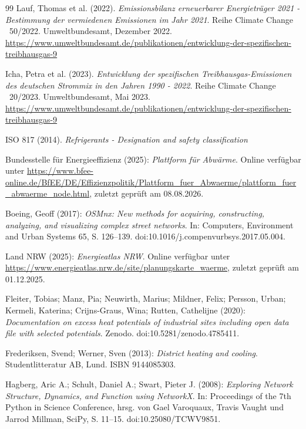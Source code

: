 \documentclass[letterpaper,11pt]{article}
\begin{document}
\begin{thebibliography}{99}
 Lauf, Thomas et al. (2022). \textit{Emissionsbilanz erneuerbarer Energieträger 2021 - Bestimmung der vermiedenen Emissionen im Jahr 2021}. Reihe Climate Change \textbar\ 50/2022. Umweltbundesamt, Dezember 2022. \\
\url{https://www.umweltbundesamt.de/publikationen/entwicklung-der-spezifischen-treibhausgas-9}

 Icha, Petra et al. (2023). \textit{Entwicklung der spezifischen Treibhausgas-Emissionen des deutschen Strommix in den Jahren 1990 - 2022}. Reihe Climate Change \textbar\ 20/2023. Umweltbundesamt, Mai 2023. \\
\url{https://www.umweltbundesamt.de/publikationen/entwicklung-der-spezifischen-treibhausgas-9}

 ISO 817 (2014). \textit{Refrigerants - Designation and safety classification}

Bundesstelle für Energieeffizienz (2025):
\textit{Plattform für Abwärme}.
Online verfügbar unter \url{https://www.bfee-online.de/BfEE/DE/Effizienzpolitik/Plattform_fuer_Abwaerme/plattform_fuer_abwaerme_node.html},
zuletzt geprüft am 08.08.2026.

Boeing, Geoff (2017):
\textit{OSMnx: New methods for acquiring, constructing, analyzing, and visualizing complex street networks}.
In: Computers, Environment and Urban Systems 65, S. 126--139.
doi:10.1016/j.compenvurbsys.2017.05.004.

Land NRW (2025):
\textit{Energieatlas NRW}.
Online verfügbar unter \url{https://www.energieatlas.nrw.de/site/planungskarte_waerme},
zuletzt geprüft am 01.12.2025.

Fleiter, Tobias; Manz, Pia; Neuwirth, Marius; Mildner, Felix; Persson, Urban;
Kermeli, Katerina; Crijns-Graus, Wina; Rutten, Cathelijne (2020):
\textit{Documentation on excess heat potentials of industrial sites including open data file with selected potentials}.
Zenodo. doi:10.5281/zenodo.4785411.

Frederiksen, Svend; Werner, Sven (2013):
\textit{District heating and cooling}.
Studentlitteratur AB, Lund.
ISBN 9144085303.

Hagberg, Aric A.; Schult, Daniel A.; Swart, Pieter J. (2008):
\textit{Exploring Network Structure, Dynamics, and Function using NetworkX}.
In: Proceedings of the 7th Python in Science Conference,
hrsg. von Gael Varoquaux, Travis Vaught und Jarrod Millman,
SciPy, S. 11--15.
doi:10.25080/TCWV9851.


\end{thebibliography}
\end{document}
